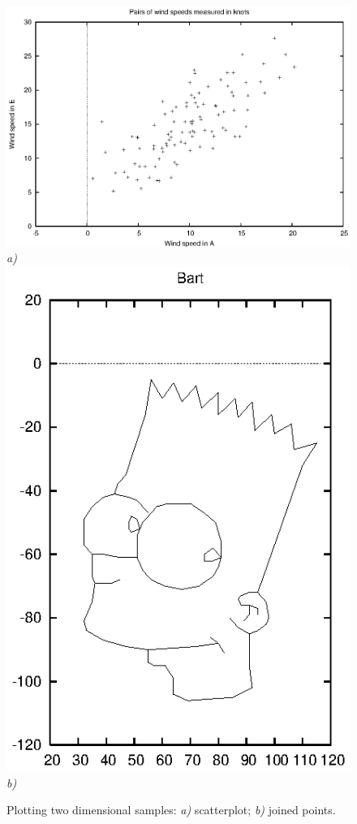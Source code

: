 \documentclass[12pt,a4paper]{article}
\begin{document}
\begin{description}
\begin{figure}
\begin{center}
\includegraphics[scale=1.0]{dataplot3.eps} \\
\emph{a)} \\ 
\includegraphics[scale=1.0]{dataplot4.eps} \\
\emph{b)} \\
\caption{Plotting two dimensional samples: \emph{a)} scatterplot; \emph{b)} joined points.}
\label{fig2}
\end{center}
\end{figure}


\end{description}
\end{document}
